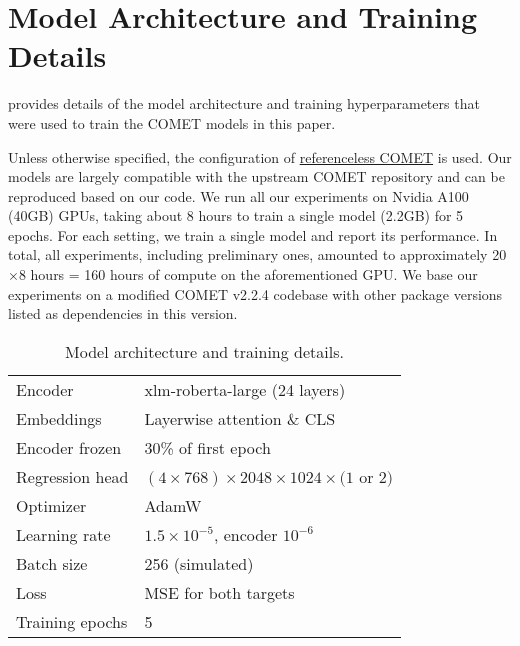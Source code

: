 


\section{Model Architecture and Training Details}
\label{app:model_details}

 provides details of the model architecture and training hyperparameters that were used to train the COMET models in this paper.

Unless otherwise specified, the configuration of \href{https://github.com/Unbabel/COMET/blob/master/configs/models/referenceless_model.yaml}{referenceless COMET} is used.
Our models are largely compatible with the upstream COMET repository and can be reproduced based on our code.
We run all our experiments on Nvidia A100 (40GB) GPUs, taking about 8 hours to train a single model (2.2GB) for 5 epochs.
For each setting, we train a single model and report its performance.
In total, all experiments, including preliminary ones, amounted to approximately 20$\times$8 hours = 160 hours of compute on the aforementioned GPU.
We base our experiments on a modified COMET v2.2.4 codebase with other package versions listed as dependencies in this version.

\begin{table}[htbp]
\small
\centering
\begin{tabular}{ll}
\toprule
Encoder & xlm-roberta-large (24 layers) \\
Embeddings & Layerwise attention \& CLS \\
Encoder frozen & 30\% of first epoch \\
Regression head & $(4{\times}768)\times 2048{\times}1024 \times (1$ or $2)$\\
Optimizer & AdamW \\
Learning rate & $1.5\times10^{-5}$, encoder $10^{-6}$ \\
Batch size &  256 (simulated) \\
Loss & MSE for both targets \\
Training epochs & 5 \\
\bottomrule
\end{tabular}
\caption{Model architecture and training details. 
}
\label{tab:model_details}
\end{table}

